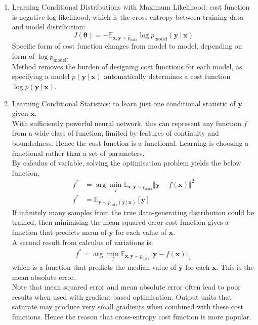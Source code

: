 \begin{definition} 
\begin{enumerate}[label=\roman*.]
\setlength{\itemsep}{0pt}
\item Learning Conditional Distributions with Maximum Likelihood: cost function is negative log-likelihood, which is the cross-entropy between training data and model distribution:
\begin{equation}
J(\bm{\theta}) = - \mathbb{E}_{\bm{x}, \bm{y} \sim \hat{p}_{\text{data}}} \log p_{\text{model}}(\bm{y} \ \vert \ \bm{x}) \nonumber
\end{equation}
Specific form of cost function changes from model to model, depending on form of $\log p_{\text{model}}$.\\
Method removes the burden of designing cost functions for each model, as specifying a model $p(\bm{y} \ \vert \ \bm{x})$ automatically determines a cost function $\log p(\bm{y} \ \vert \ \bm{x})$.
\item Learning Conditional Statistics: to learn just one conditional statistic of $\bm{y}$ given $\bm{x}$.\\
With sufficiently powerful neural network, this can represent any function $f$ from a wide class of function, limited by features of continuity and boundedness. Hence the cost function is a functional. Learning is choosing a functional rather than a set of parameters.\\
By calculus of variable, solving the optimisation problem yields the below function,
\begin{align}
f^* &= \arg \min_f \mathbb{E}_{\bm{x}, \bm{y} \sim p_{\text{data}}} \Vert \bm{y} - f(\bm{x}) \Vert^2 \nonumber \\
f^* &= \mathbb{E}_{\bm{y} \sim p_{\text{data}}(\bm{y} \ \vert \ \bm{x})} [\bm{y}] \nonumber
\end{align}
If infinitely many samples from the true data-generating distribution could be trained, then minimising the mean squared error cost function gives a function that predicts mean of $\bm{y}$ for each value of $\bm{x}$.\\
A second result from calculus of variations is:
\begin{align}
f^* = \arg \min_f \mathbb{E}_{\bm{x}, \bm{y} \sim p_{\text{data}}} \Vert \bm{y} - f(\bm{x}) \Vert_1 \nonumber
\end{align}
which is a function that predicts the median value of $\bm{y}$ for each $\bm{x}$. This is the mean absolute error.\\
Note that mean squared error and mean absolute error often lead to poor results when used with gradient-based optimisation. Output units that saturate may produce very small gradients when combined with these cost functions. Hence the reason that cross-entropy cost function is more popular.
\end{enumerate}
\end{definition}



